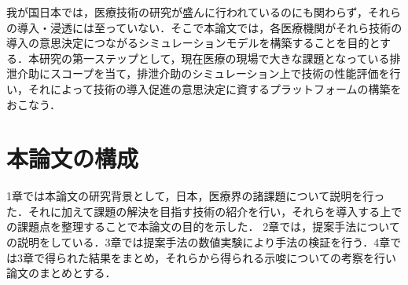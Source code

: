 我が国日本では，医療技術の研究が盛んに行われているのにも関わらず，それらの導入・浸透には至っていない．そこで本論文では，各医療機関がそれら技術の導入の意思決定につながるシミュレーションモデルを構築することを目的とする．本研究の第一ステップとして，現在医療の現場で大きな課題となっている排泄介助にスコープを当て，排泄介助のシミュレーション上で技術の性能評価を行い，それによって技術の導入促進の意思決定に資するプラットフォームの構築をおこなう．

\section{本論文の構成}

1章では本論文の研究背景として，日本，医療界の諸課題について説明を行った．それに加えて課題の解決を目指す技術の紹介を行い，それらを導入する上での課題点を整理することで本論文の目的を示した．
2章では，提案手法についての説明をしている．3章では提案手法の数値実験により手法の検証を行う．4章では3章で得られた結果をまとめ，それらから得られる示唆についての考察を行い論文のまとめとする．
